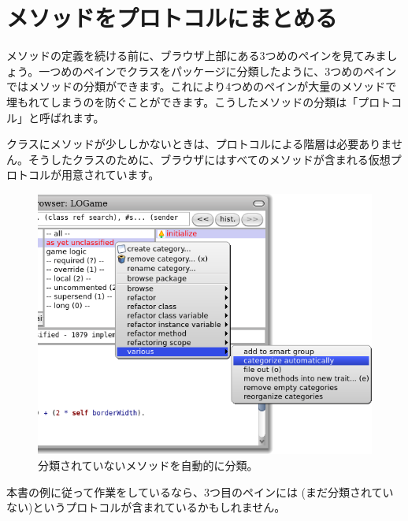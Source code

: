 \documentclass[a4paper,10pt,twoside]{book}
\begin{document}

\section{メソッドをプロトコルにまとめる}

メソッドの定義を続ける前に、ブラウザ上部にある3つめのペインを見てみましょう。一つめのペインでクラスをパッケージに分類したように、3つめのペインではメソッドの分類ができます。これにより4つめのペインが大量のメソッドで埋もれてしまうのを防ぐことができます。こうしたメソッドの分類は「プロトコル」と呼ばれます。


クラスにメソッドが少ししかないときは、プロトコルによる階層は必要ありません。そうしたクラスのために、ブラウザにはすべてのメソッドが含まれる仮想プロトコルが用意されています。


\begin{figure}[htbp]
   \centering
   \includegraphics[width=\textwidth]{Categorize}
   \caption{分類されていないメソッドを自動的に分類。 }
\end{figure}

本書の例に従って作業をしているなら、3つ目のペインには (まだ分類されていない)というプロトコルが含まれているかもしれません。
\end{document}
